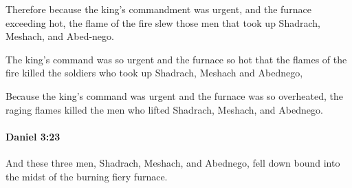 			\begin{versebox}
					\item[BHS] 
					\item[LXX] 
					\item[ASV] Therefore because the king's commandment was urgent, and the furnace exceeding hot, the flame of the fire slew those men that took up Shadrach, Meshach, and Abed-nego.
					\item[NIV] The king’s command was so urgent and the furnace so hot that the flames of the fire killed the soldiers who took up Shadrach, Meshach and Abednego,
					\item[NRSV] Because the king’s command was urgent and the furnace was so overheated, the raging flames killed the men who lifted Shadrach, Meshach, and Abednego.
			\end{versebox}

		\paragraph{Daniel 3:23} %
			\label{DANIEL-3-23}

			And these three men, Shadrach, Meshach, and Abednego, fell down bound into the midst of the burning fiery furnace.

